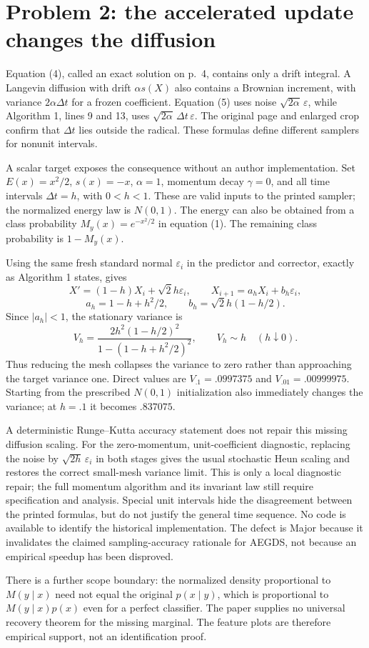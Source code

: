 \documentclass[10pt]{article}
\begin{document}
\section*{Problem 2: the accelerated update changes the diffusion}
Equation (4), called an exact solution on p. 4, contains only a drift integral. A Langevin diffusion with drift \(\alpha s(X)\) also contains a Brownian increment, with variance \(2\alpha\Delta t\) for a frozen coefficient. Equation (5) uses noise \(\sqrt{2\alpha}\,\varepsilon\), while Algorithm 1, lines 9 and 13, uses \(\sqrt{2\alpha}\,\Delta t\,\varepsilon\). The original page and enlarged crop confirm that \(\Delta t\) lies outside the radical. These formulas define different samplers for nonunit intervals.\par
A scalar target exposes the consequence without an author implementation. Set \(E(x)=x^2/2\), \(s(x)=-x\), \(\alpha=1\), momentum decay \(\gamma=0\), and all time intervals \(\Delta t=h\), with \(0<h<1\). These are valid inputs to the printed sampler; the normalized energy law is \(N(0,1)\). The energy can also be obtained from a class probability \(M_y(x)=e^{-x^2/2}\) in equation (1). The remaining class probability is \(1-M_y(x)\).\par
Using the same fresh standard normal \(\varepsilon_i\) in the predictor and corrector, exactly as Algorithm 1 states, gives \[X'=(1-h)X_i+\sqrt2h\varepsilon_i,\qquad
 X_{i+1}=a_hX_i+b_h\varepsilon_i,\] \[a_h=1-h+h^2/2,\qquad b_h=\sqrt2h(1-h/2).\] Since \(|a_h|<1\), the stationary variance is \[V_h=\frac{2h^2(1-h/2)^2}{1-(1-h+h^2/2)^2},
 \qquad V_h\sim h\quad(h\downarrow0).\] Thus reducing the mesh collapses the variance to zero rather than approaching the target variance one. Direct values are \(V_{.1}=.0997375\) and \(V_{.01}=.00999975\). Starting from the prescribed \(N(0,1)\) initialization also immediately changes the variance; at \(h=.1\) it becomes \(.837075\).\par
A deterministic Runge–Kutta accuracy statement does not repair this missing diffusion scaling. For the zero-momentum, unit-coefficient diagnostic, replacing the noise by \(\sqrt{2h}\,\varepsilon_i\) in both stages gives the usual stochastic Heun scaling and restores the correct small-mesh variance limit. This is only a local diagnostic repair; the full momentum algorithm and its invariant law still require specification and analysis. Special unit intervals hide the disagreement between the printed formulas, but do not justify the general time sequence. No code is available to identify the historical implementation. The defect is Major because it invalidates the claimed sampling-accuracy rationale for AEGDS, not because an empirical speedup has been disproved.\par
There is a further scope boundary: the normalized density proportional to \(M(y\mid x)\) need not equal the original \(p(x\mid y)\), which is proportional to \(M(y\mid x)p(x)\) even for a perfect classifier. The paper supplies no universal recovery theorem for the missing marginal. The feature plots are therefore empirical support, not an identification proof.\par
\end{document}
